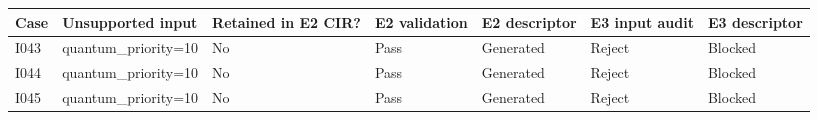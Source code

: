 \begin{tabular}{lllllll}
\toprule
Case & Unsupported input & Retained in E2 CIR? & E2 validation & E2 descriptor & E3 input audit & E3 descriptor \\
\midrule
I043 & quantum\_priority=10 & No & Pass & Generated & Reject & Blocked \\
I044 & quantum\_priority=10 & No & Pass & Generated & Reject & Blocked \\
I045 & quantum\_priority=10 & No & Pass & Generated & Reject & Blocked \\
\bottomrule
\end{tabular}
